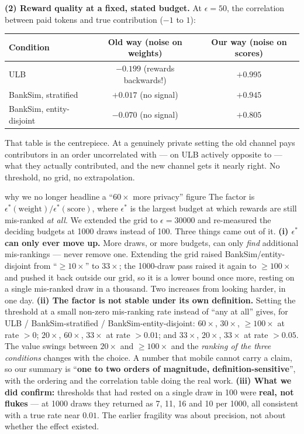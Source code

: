 \documentclass[11pt]{article}
\begin{document}
\textbf{(2) Reward quality at a fixed, stated budget.} At $\epsilon=50$, the correlation between paid
tokens and true contribution ($-1$ to $1$):

\begin{center}
\small
\begin{tabularx}{0.92\linewidth}{Xcc}
\toprule
\textbf{Condition} & \textbf{Old way (noise on weights)} & \textbf{Our way (noise on scores)} \\
\midrule
ULB                      & $-0.199$ (rewards backwards!) & $\mathbf{+0.995}$ \\
BankSim, stratified      & $+0.017$ (no signal)          & $\mathbf{+0.945}$ \\
BankSim, entity-disjoint & $-0.070$ (no signal)          & $\mathbf{+0.805}$ \\
\bottomrule
\end{tabularx}
\end{center}

That table is the centrepiece. At a genuinely private setting the old channel pays contributors in an
order uncorrelated with --- on ULB actively opposite to --- what they actually contributed, and the new
channel gets it nearly right. No threshold, no grid, no extrapolation.

\begin{caveat}{why we no longer headline a ``$60\times$ more privacy'' figure}
The factor is $\epsilon^*(\text{weight})/\epsilon^*(\text{score})$, where $\epsilon^*$ is the largest
budget at which rewards are still mis-ranked \emph{at all}. We extended the grid to $\epsilon=30000$ and
re-measured the deciding budgets at 1000 draws instead of 100. Three things came out of it.
\textbf{(i) $\epsilon^*$ can only ever move up.} More draws, or more budgets, can only \emph{find}
additional mis-rankings --- never remove one. Extending the grid raised BankSim/entity-disjoint from
``$\geq\!10\times$'' to $33\times$; the 1000-draw pass raised it again to $\geq\!100\times$ and pushed it
back outside our grid, so it is a lower bound once more, resting on a single mis-ranked draw in a
thousand. Two increases from looking harder, in one day.
\textbf{(ii) The factor is not stable under its own definition.} Setting the threshold at a small
non-zero mis-ranking rate instead of ``any at all'' gives, for ULB / BankSim-stratified /
BankSim-entity-disjoint: $60\times$, $30\times$, $\geq\!100\times$ at rate $>0$; $20\times$, $60\times$,
$33\times$ at rate $>0.01$; and $33\times$, $20\times$, $33\times$ at rate $>0.05$. The value swings
between $20\times$ and $\geq\!100\times$ and the \emph{ranking of the three conditions} changes with the
choice. A number that mobile cannot carry a claim, so our summary is ``\textbf{one to two orders of
magnitude, definition-sensitive}'', with the ordering and the correlation table doing the real work.
\textbf{(iii) What we did confirm:} thresholds that had rested on a single draw in 100 were \textbf{real,
not flukes} --- at 1000 draws they returned as 7, 11, 16 and 10 per 1000, all consistent with a true rate
near $0.01$. The earlier fragility was about precision, not about whether the effect existed.
\end{caveat}
\end{document}
